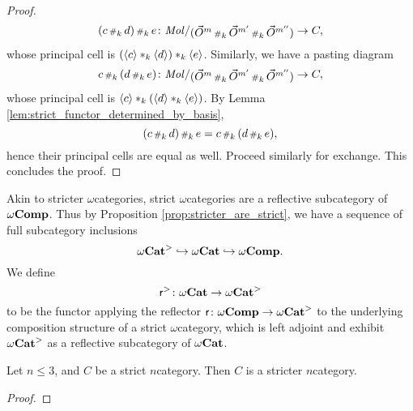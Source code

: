 \begin{proof}
    \begin{equation*}
        (c \cp{k} d) \cp{k} e \colon \molecin{(\dglobe{m} \cp{k} \dglobe{m'} \cp{k} \dglobe{m''})} \to C,
    \end{equation*}
    whose principal cell is \( (\langle c\rangle *_{k} \langle d\rangle) *_{k} \langle e\rangle \).
    Similarly, we have a pasting diagram
    \begin{equation*}
        c \cp{k} (d \cp{k} e) \colon \molecin{(\dglobe{m} \cp{k} \dglobe{m'} \cp{k} \dglobe{m''})} \to C,
    \end{equation*}
    whose principal cell is \( \langle c\rangle *_{k} (\langle d\rangle *_{k} \langle e\rangle) \).
    By Lemma \ref{lem:strict_functor_determined_by_basis}, 
    \begin{equation*}
         (c \,{\scriptstyle\#}_{k}\, d) \,{\scriptstyle\#}_{k}\, e = c \,{\scriptstyle\#}_{k}\, (d \,{\scriptstyle\#}_{k}\, e),
    \end{equation*}
    hence their principal cells are equal as well.
    Proceed similarly for exchange.
    This concludes the proof.
\end{proof} 

Akin to stricter \( \omega \)\nbd categories, strict \( \omega \)\nbd categories are a reflective subcategory of \( \omega\mathbf{Comp} \).
Thus by Proposition \ref{prop:stricter_are_strict}, we have a sequence of full subcategory inclusions
\begin{equation*}
     {\omega\mathbf{Cat}}^> \hookrightarrow {\omega\mathbf{Cat}} \hookrightarrow \omega\mathbf{Comp}.
\end{equation*}
We define
\begin{equation*}
    \mathsf{r}^{>} \colon {\omega\mathbf{Cat}} \to {\omega\mathbf{Cat}}^>
\end{equation*}
to be the functor applying the reflector \( \mathsf{r} \colon \omega\mathbf{Comp} \to {\omega\mathbf{Cat}}^>  \) to the underlying composition structure of a strict \( \omega \)\nbd category, which is left adjoint and exhibit \( {\omega\mathbf{Cat}}^> \) as a reflective subcategory of \( {\omega\mathbf{Cat}} \).


\begin{thm}\label{thm:strict_le_3_are_stricter}
    Let \( n \le 3 \), and \( C \) be a strict \( n \)\nbd category.
    Then \( C \) is a stricter \( n \)\nbd category.
\end{thm}
\begin{proof}
\end{proof}




